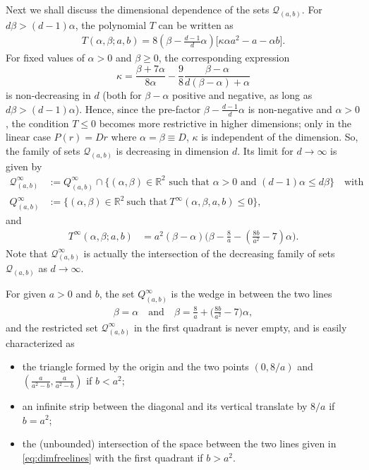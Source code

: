 \documentclass[reqno]{amsart}
\newcommand{\R}{\mathbb{R}}
\begin{document}
Next we shall discuss the dimensional dependence of the sets $\mathcal Q_{(a,b)}$. 
For $d\beta>(d-1)\alpha$, the polynomial $T$ can be written as
    \begin{align*}
        T(\alpha,\beta;a,b) 
        = 8\left(\beta-\frac{d-1}{d}\alpha \right)\big[\kappa\alpha a^2-a-\alpha b\big].
    \end{align*}
    For fixed values of $\alpha>0$ and $\beta\ge0$, the corresponding expression
    \[
        \kappa = \frac{\beta+7\alpha}{8\alpha} -\frac{9}{8}\frac{\beta-\alpha}{d(\beta-\alpha)+\alpha}
    \]
    is non-decreasing in $d$ (both for $\beta-\alpha$ positive and negative, as long as $d\beta>(d-1)\alpha$). Hence, since the pre-factor $\beta-\frac{d-1}{d}\alpha$ is non-negative and $\alpha>0$, the condition $T\le0$ becomes more restrictive in higher dimensions; only in the linear case $P(r)=Dr$ where $\alpha=\beta\equiv D$, $\kappa$ is independent of the dimension. 
So, the family of sets $\mathcal Q_{(a,b)}$ is decreasing in dimension $d$. Its limit for $d\to\infty$ is given by 
\begin{align*}
    \mathcal{Q}^\infty_{(a,b)} &:= Q^\infty_{(a,b)} \cap \{(\alpha,\beta)\in\R^2 \text{ such that } \alpha>0 \text{ and } (d-1)\alpha\le d\beta \}\quad \text{with}\\
    Q^\infty_{(a,b)} &:= \{ (\alpha,\beta)\in\R^2\ \text{such that}\ T^\infty(\alpha,\beta,a,b)\le 0\},
\end{align*}
and
\begin{align*}    
    T^\infty(\alpha,\beta;a,b) 
    &= a^2(\beta-\alpha)\Big(\beta-\frac8a-\left(\frac{8b}{a^2}-7\right)\alpha\Big).
\end{align*}
Note that $\mathcal Q^\infty_{(a,b)}$ is actually the intersection of the decreasing family of sets $\mathcal Q_{(a,b)}$ as $d\to\infty$.

For given $a>0$ and $b$, the set $Q^\infty_{(a,b)}$ is the wedge in between the two lines
\begin{align}
    \label{eq:dimfreelines}
    \beta = \alpha \quad \text{and} \quad \beta = \frac8a+\Big(\frac{8b}{a^2}-7\Big)\alpha,
\end{align}
and the restricted set $\mathcal Q^\infty_{(a,b)}$ in the first quadrant is never empty, and is easily characterized as
\begin{itemize}
    \item the triangle formed by the origin and the two points $(0,8/a)$ and $(\frac a{a^2-b},\frac a{a^2-b})$ if $b<a^2$;
    \item an infinite strip between the diagonal and its vertical translate by $8/a$ if $b=a^2$;
    \item the (unbounded) intersection of the space between the two lines given in \eqref{eq:dimfreelines} with the first quadrant if $b>a^2$.
\end{itemize}
    
\end{document}
